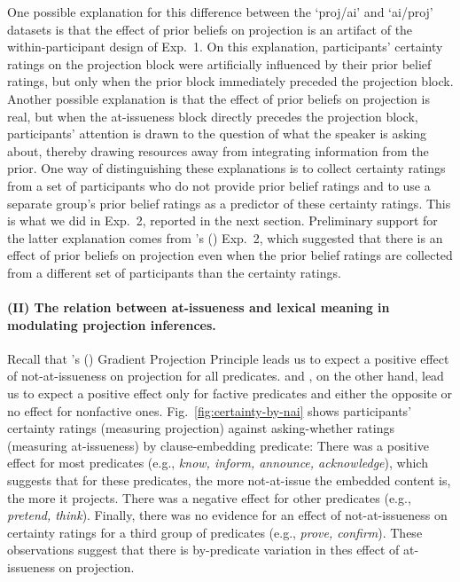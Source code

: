 \documentclass[11pt,fleqn]{article}
\newcommand{\6}{\mbox{$[\hspace*{-.6mm}[$}}
\newcommand{\9}{\mbox{$]\hspace*{-.6mm}]$}}
\newcommand{\citetpos}[1]{\citeauthor{#1}'s (\citeyear{#1})}
\begin{document}
One possible explanation for this difference between the `proj/ai' and `ai/proj' datasets is that the effect of prior beliefs on projection is an artifact of the within-participant design of Exp.~1. On this explanation, participants' certainty ratings on the projection block were artificially influenced by their prior belief ratings, but only when the prior block immediately preceded the projection block. Another possible explanation is that the effect of prior beliefs on projection is real, but when the at-issueness block directly precedes the projection block, participants' attention is drawn to the question of what the speaker is asking about, thereby drawing resources away from integrating information from the prior. One way of distinguishing these explanations is to collect certainty ratings from a set of participants who do not provide prior belief ratings and to use a separate group's prior belief ratings as a predictor of these certainty ratings. This is what we did in Exp.~2,  reported in the next section. Preliminary support for the latter explanation comes from \citetpos{degen-tonhauser-openmind} Exp.~2, which suggested that there is an effect of prior beliefs on projection even when the prior belief ratings are collected from a different set of participants than the certainty ratings.
                          
\paragraph{(II) The relation between at-issueness and lexical meaning in modulating projection inferences.} Recall that \citetpos{tbd-variability} Gradient Projection Principle leads us to expect a positive effect of not-at-issueness on projection for all predicates. \cite{djaerv-bacovcin-salt27,djaerv-bacovcin2020} and \cite{mahler-etal2020}, on the other hand, lead us to expect a positive effect only for factive predicates and either the opposite or no effect for nonfactive ones. Fig.~\ref{fig:certainty-by-nai} shows participants' certainty ratings (measuring projection) against asking-whether ratings (measuring at-issueness) by clause-embedding predicate: There was a positive effect for most predicates (e.g., {\em know, inform, announce, acknowledge}), which suggests that for these predicates, the more not-at-issue the embedded content is, the more it projects. There was a negative effect for other predicates (e.g., {\em pretend, think}). Finally, there was no evidence for an effect of not-at-issueness on certainty ratings for a third group of predicates (e.g., {\em prove, confirm}). These observations suggest that there is by-predicate variation in thes effect of at-issueness on projection.
\end{document}
